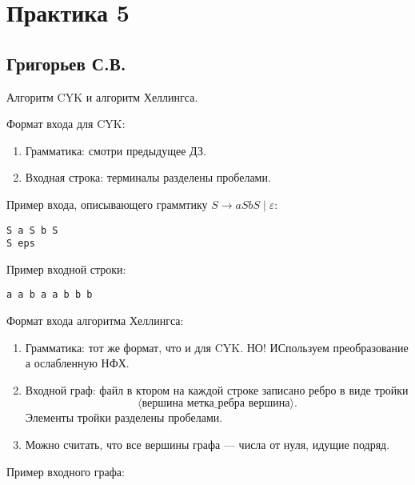 \section{Практика 5}

\subsection{Григорьев С.В.}

Алгоритм CYK и алгоритм Хеллингса.

Формат входа для CYK:
\begin{enumerate}
\item Грамматика: смотри предыдущее ДЗ.
\item Входная строка: терминалы разделены пробелами.
\end{enumerate}

Пример входа, описывающего граммтику $S \to a S b S \mid \varepsilon$:

\begin{verbatim}
S a S b S
S eps 
\end{verbatim}

Пример входной строки:
\begin{verbatim}
a a b a a b b b 
\end{verbatim}


Формат входа алгоритма Хеллингса:
\begin{enumerate}
\item Грамматика: тот же формат, что и для CYK. НО! ИСпользуем преобразование а ослабленную НФХ.
\item Входной граф: файл в ктором на каждой строке записано ребро в виде тройки 
$$
\langle\textit{вершина } \textit{метка\_ребра} \textit{ вершина}\rangle.
$$
Элементы тройки разделены пробелами.
\item Можно считать, что все вершины графа --- числа от нуля, идущие подряд.
\end{enumerate}

Пример входного графа:

\begin{center}
\end{center}

